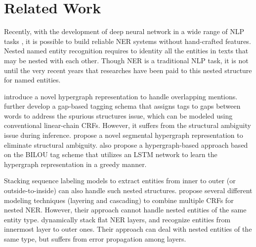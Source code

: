 \documentclass[11pt,a4paper]{article}
\begin{document}
\section{Related Work}

Recently, with the development of deep neural network in a wide range of NLP tasks \cite{bai-zhao-2018-deep,huang-etal-2018-moon,huang-zhao-2018-chinese,he-etal-2018-syntax,he-etal-2019-syntax,li-etal-2018-seq2seq,li-etal-2018-unified,li2019dependency,zhou-zhao-2019-head,xiao-etal-2019-lattice, zhang-zhao-2018-one,zhang-etal-2019-open,zhang2019dcmn+,zhang2020SemBERT,zhang2020sg}, it is possible to build reliable 
NER systems without hand-crafted  features.
Nested named entity recognition requires to identity all the entities in texts that may be nested with each other. 
Though NER is a traditional NLP task, it is not until the very recent years that researches have been paid to this nested structure for named entities.
 
\cite{lu2015joint} introduce a novel hypergraph representation to handle overlapping mentions.
\cite{muis2018labeling} further develop a gap-based tagging
schema that assigns tags to gaps between words to address the spurious structures issue, which can be modeled using conventional linear-chain CRFs. However, it suffers from the structural ambiguity issue during inference. 
\cite{wang2018neural} propose a novel segmental hypergraph
representation to eliminate structural ambiguity.
\cite{katiyar2018nested} also propose a hypergraph-based approach based on the BILOU tag scheme that utilizes an LSTM network to learn the hypergraph representation in a greedy manner.

Stacking sequence labeling models to extract entities from inner to outer (or outside-to-inside) can also handle such nested structures.
\cite{alex2007recognising} propose several different modeling techniques (layering and cascading) to combine multiple CRFs for nested NER. However, their approach cannot handle nested entities of the same entity type.
\cite{ju2018neural} dynamically stack flat NER layers, and recognize entities from innermost layer to outer ones. Their approach can deal with nested entities of the same type, but suffers from error propagation among layers. 
\end{document}
